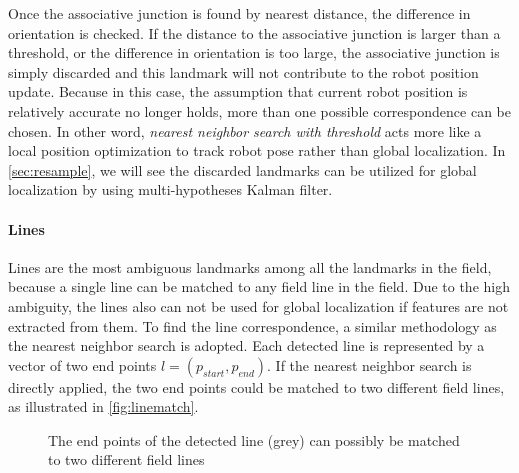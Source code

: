Once the associative junction is found by nearest distance, the difference in orientation is checked. If the distance to the associative junction is larger than a threshold, or the difference in orientation is too large, the associative junction is simply discarded and this landmark will not contribute to the robot position update. Because in this case, the assumption that current robot position is relatively accurate no longer holds, more than one possible correspondence can be chosen. In other word, \textit{nearest neighbor search with threshold} acts more like a local position optimization to track robot pose rather than global localization. In \autoref{sec:resample}, we will see the discarded landmarks can be utilized for global localization by using multi-hypotheses Kalman filter.

\paragraph{Lines}
Lines are the most ambiguous landmarks among all the landmarks in the field, because a single line can be matched to any field line in the field. Due to the high ambiguity, the lines also can not be used for global localization if features are not extracted from them. To find the line correspondence, a similar methodology as the nearest neighbor search is adopted. Each detected line is represented by a vector of two end points $l=(p_{start}, p_{end})$. If the nearest neighbor search is directly applied, the two end points could be matched to two different field lines, as illustrated in \autoref{fig:linematch}.

\begin{figure}[h!]
\centering
{}
\caption{The end points of the detected line (grey) can possibly be matched to two different field lines}
\label{fig:linematch}
\end{figure}


